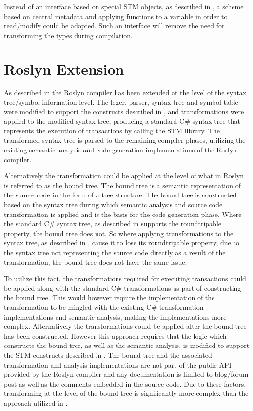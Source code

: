 Instead of an interface based on special \ac{STM} objects, as described in , a scheme based on central metadata and applying functions to a variable in order to read/modify could be adopted. Such an interface will remove the need for transforming the types during compilation.

\section{Roslyn Extension}
As described in  the Roslyn compiler has been extended at the level of the syntax tree/symbol information level. The lexer, parser, syntax tree and symbol table were modified to support the constructs described in , and transformations were applied to the modified syntax tree, producing a standard C\# syntax tree that represents the execution of transactions by calling the \ac{STM} library. The transformed syntax tree is parsed to the remaining compiler phases, utilizing the existing semantic analysis and code generation implementations of the Roslyn compiler. 

Alternatively the transformation could be applied at the level of what in Roslyn is referred to as the bound tree. The bound tree is a semantic representation of the source code in the form of a tree structure. The bound tree is constructed based on the syntax tree during which semantic analysis and source code transformation is applied and is the basis for the code generation phase. Where the standard C\# syntax tree, as described in  supports the roundtripable property, the bound tree does not. So where applying transformations to the syntax tree, as described in , cause it to lose its roundtripable property, due to the syntax tree not representing the source code directly as a result of the transformation, the bound tree does not have the same issue.

To utilize this fact, the transformations required for executing transactions could be applied along with the standard C\# transformations as part of constructing the bound tree. This would however require the implementation of the transformation to be mingled with the existing C\# transformation implementations and semantic analysis, making the implementations more complex. Alternatively the transformations could be applied after the bound tree has been constructed. However this approach requires that the logic which constructs the bound tree, as well as the semantic analysis, is modified to support the \ac{STM} constructs described in . The bound tree and the associated transformation and analysis implementations are not part of the public \ac{API} provided by the Roslyn compiler and any documentation is limited to blog/forum post as well as the comments embedded in the source code. Due to these factors, transforming at the level of the bound tree is significantly more complex than the approach utilized in .

